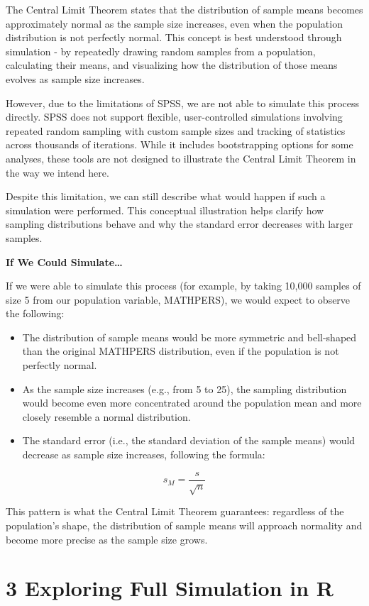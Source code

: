 \documentclass[
  letterpaper,
  DIV=11,
  numbers=noendperiod]{scrreprt}
\begin{document}
The Central Limit Theorem states that the distribution of sample means
becomes approximately normal as the sample size increases, even when the
population distribution is not perfectly normal. This concept is best
understood through simulation - by repeatedly drawing random samples
from a population, calculating their means, and visualizing how the
distribution of those means evolves as sample size increases.

However, due to the limitations of SPSS, we are not able to simulate
this process directly. SPSS does not support flexible, user-controlled
simulations involving repeated random sampling with custom sample sizes
and tracking of statistics across thousands of iterations. While it
includes bootstrapping options for some analyses, these tools are not
designed to illustrate the Central Limit Theorem in the way we intend
here.

Despite this limitation, we can still describe what would happen if such
a simulation were performed. This conceptual illustration helps clarify
how sampling distributions behave and why the standard error decreases
with larger samples.

\textbf{If We Could Simulate\ldots{}}

If we were able to simulate this process (for example, by taking 10,000
samples of size 5 from our population variable, MATHPERS), we would
expect to observe the following:

\begin{itemize}
\item
  The distribution of sample means would be more symmetric and
  bell-shaped than the original MATHPERS distribution, even if the
  population is not perfectly normal.
\item
  As the sample size increases (e.g., from 5 to 25), the sampling
  distribution would become even more concentrated around the population
  mean and more closely resemble a normal distribution.
\item
  The standard error (i.e., the standard deviation of the sample means)
  would decrease as sample size increases, following the formula:
\end{itemize}

\[
s_M = \frac{s}{\sqrt{n}}
\]

This pattern is what the Central Limit Theorem guarantees: regardless of
the population's shape, the distribution of sample means will approach
normality and become more precise as the sample size grows.

\section*{3 Exploring Full Simulation in
R}\label{exploring-full-simulation-in-r}
\end{document}
